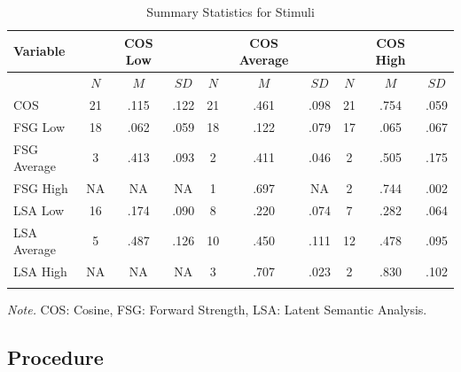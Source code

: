 \documentclass[english,,man]{apa6}
\begin{document}
\begin{table}[tbp]
\begin{center}
\begin{threeparttable}
\caption{\label{tab:stim-table}Summary Statistics for Stimuli}
\begin{tabular}{lccccccccc}
\toprule
Variable &   & COS Low &   &   & COS Average &   &   & COS High &  \\
\midrule
 & $N$ & $M$ & $SD$ & $N$ & $M$ & $SD$ & $N$ & $M$ & $SD$\\
COS & 21 & .115 & .122 & 21 & .461 & .098 & 21 & .754 & .059\\
FSG Low & 18 & .062 & .059 & 18 & .122 & .079 & 17 & .065 & .067\\
FSG Average & 3 & .413 & .093 & 2 & .411 & .046 & 2 & .505 & .175\\
FSG High & NA & NA & NA & 1 & .697 & NA & 2 & .744 & .002\\
LSA Low & 16 & .174 & .090 & 8 & .220 & .074 & 7 & .282 & .064\\
LSA Average & 5 & .487 & .126 & 10 & .450 & .111 & 12 & .478 & .095\\
LSA High & NA & NA & NA & 3 & .707 & .023 & 2 & .830 & .102\\
\bottomrule
\addlinespace
\end{tabular}
\begin{tablenotes}[para]
\normalsize{\textit{Note.} COS: Cosine, FSG: Forward Strength, LSA: Latent Semantic Analysis.}
\end{tablenotes}
\end{threeparttable}
\end{center}
\end{table}

\subsection{Procedure}\label{procedure}
\end{document}
